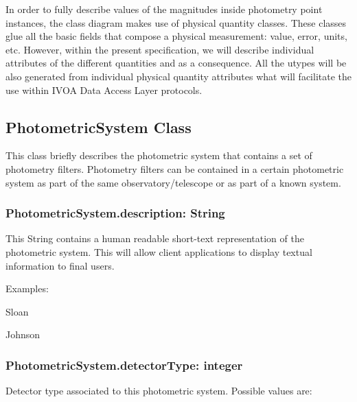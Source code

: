 \documentclass[11pt,a4paper]{ivoa}
\begin{document}

\newpage


\newpage
In order to fully describe values of the magnitudes inside photometry point 
instances, the class diagram makes use of physical quantity classes. These 
classes glue all the basic fields that compose a physical measurement: value, 
error, units, etc. However, within the present specification, we will describe 
individual attributes of the different quantities and as a consequence. All 
the utypes will be also generated from individual physical quantity 
attributes what will facilitate the use within IVOA Data Access Layer protocols.
\par

\subsection{PhotometricSystem Class}
This class briefly describes the photometric system that contains a set of 
photometry filters. Photometry filters can be contained in a certain 
photometric system as part of the same observatory/telescope or as part 
of a known system.
\par

\subsubsection{PhotometricSystem.description: String}
This String contains a human readable short-text representation of the 
photometric system. This will allow client applications to display 
textual information to final users.
\par

Examples:


Sloan \par
Johnson
\bigskip



\subsubsection{PhotometricSystem.detectorType: integer}
Detector type associated to this photometric system. Possible 
values are:


\end{document}
